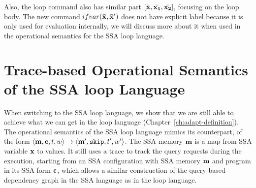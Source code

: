 
Also, the loop command also has similar part $ [\bar{{\bf{{x}}}}, \bar{{\bf{{x_1}}}}, \bar{{\bf{{x_2}}}}]$, focusing on the loop body. The new command ${{ifvar(\bar{{\bf{{x}}}}, \bar{{\bf{{x}}}}')}}$ does not have explicit label because it is only used for evaluation internally, we will discuss more about it when used in the operational semantics for the SSA loop language. 


\section{Trace-based Operational Semantics of the SSA loop Language}
\label{sec:adapt-ssa-os}
When switching to the SSA loop language, we show that we are still able to achieve what we can get in the loop language (Chapter~\ref{ch:adapt-definition}). The operational semantics of the SSA loop language mimics its counterpart, of the form $\langle {\bf{{m}}}, {\bf{{c}}}, t, w \rangle \to \langle {\bf{{m'}}}, \mathtt{skip}, t', w' \rangle$. The SSA memory ${\bf{{m}}}$ is a map from SSA variable ${\bf{{x}}}$ to values. It still uses a trace to track the query requests during the execution, starting from an SSA configuration with SSA memory ${\bf{{m}}}$ and program in its SSA form ${\bf{{c}}}$, which allows a similar construction of the query-based dependency graph in the SSA language as in the { loop} language.

